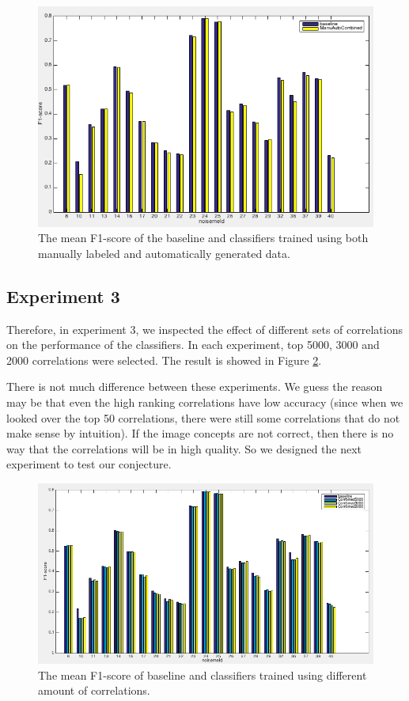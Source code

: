 \documentclass[conference, 11pt, onecolumn]{IEEEtran}
\begin{document}
\begin{figure}[h!]
\centering
\includegraphics[scale=0.45]{figure/fmanuAndAuto.png}
\caption{The mean F1-score of the baseline and classifiers trained using both manually labeled and automatically generated data.}
\label{fig:fmanuAndAuto}
\end{figure}

\subsection{Experiment 3}
Therefore, in experiment 3, we inspected the effect of different sets of correlations on the performance of the classifiers. In each experiment, top 5000, 3000 and 2000 correlations were selected. 
The result is showed in Figure \ref{fig:diffCorrelations}.

There is not much difference between these experiments. We guess the reason may be that even the high ranking correlations have low accuracy (since when we looked over the top 50 correlations, there were still some correlations that do not make sense by intuition). If the image concepts are not correct, then there is no way that the correlations will be in high quality. So we designed the next experiment to test our conjecture.

\begin{figure}[h!]
\centering
\includegraphics[scale=0.45]{figure/diffCorrelations.png}
\caption{The mean F1-score of baseline and classifiers trained using different amount of correlations.}
\label{fig:diffCorrelations}
\end{figure}
\end{document}
